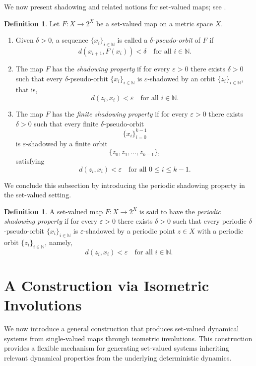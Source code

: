 \documentclass{amsart}
\theoremstyle{definition}
\newtheorem{definition}[theorem]{Definition}
\begin{document}
We now present shadowing and related notions for set-valued maps; see \cite{RT,MMT}.

\begin{definition}
Let $F:X\to 2^X$ be a set-valued map on a metric space $X$.

\begin{enumerate}
    \item Given $\delta>0$, a sequence $\{x_i\}_{i\in\mathbb{N}}$ is called a \emph{$\delta$-pseudo-orbit} of $F$ if
    \[
    d(x_{i+1},F(x_i))<\delta
    \quad \text{for all } i\in\mathbb{N}.
    \]

    \item The map $F$ has the \emph{shadowing property} if for every $\varepsilon>0$ there exists $\delta>0$ such that every $\delta$-pseudo-orbit $\{x_i\}_{i\in\mathbb{N}}$ is $\varepsilon$-shadowed by an orbit $\{z_i\}_{i\in\mathbb{N}}$, that is,
    \[
    d(z_i,x_i)<\varepsilon
    \quad \text{for all } i\in\mathbb{N}.
    \]

    \item The map $F$ has the \emph{finite shadowing property} if for every $\varepsilon>0$ there exists $\delta>0$ such that every finite $\delta$-pseudo-orbit
    \[
    \{x_i\}_{i=0}^{k-1}
    \]
    is $\varepsilon$-shadowed by a finite orbit
    \[
    \{z_0,z_1,\ldots,z_{k-1}\},
    \]
    satisfying
    \[
    d(z_i,x_i)<\varepsilon
    \quad \text{for all } 0\leq i\leq k-1.
    \]
\end{enumerate}
\end{definition}

We conclude this subsection by introducing the periodic shadowing property in the set-valued setting.

\begin{definition}
A set-valued map $F:X\to 2^X$ is said to have the \emph{periodic shadowing property} if for every $\varepsilon>0$ there exists $\delta>0$ such that every periodic $\delta$-pseudo-orbit $\{x_i\}_{i\in\mathbb{N}}$ is $\varepsilon$-shadowed by a periodic point $z\in X$ with a periodic orbit $\{z_i\}_{i\in\mathbb{N}}$, namely,
\[
d(z_i,x_i)<\varepsilon
\quad \text{for all } i\in\mathbb{N}.
\]
\end{definition}


\section{A Construction via Isometric Involutions}

We now introduce a general construction that produces set-valued dynamical systems from single-valued maps through isometric involutions. This construction provides a flexible mechanism for generating set-valued systems inheriting relevant dynamical properties from the underlying deterministic dynamics.
\end{document}
